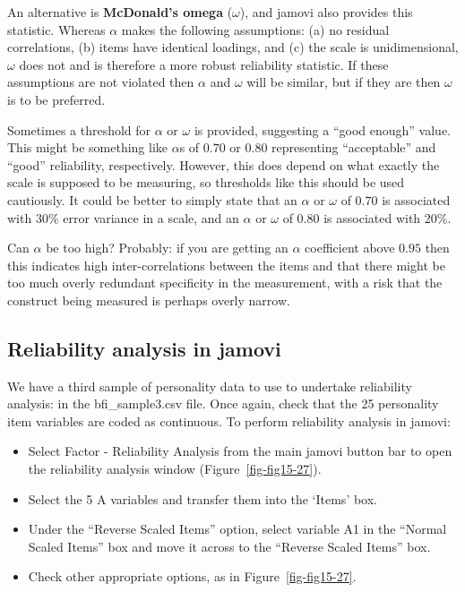 \documentclass[
  a4paper,
]{book}
\begin{document}
An alternative is \textbf{McDonald's omega} (\(\omega\)), and jamovi
also provides this statistic. Whereas \(\alpha\) makes the following
assumptions: (a) no residual correlations, (b) items have identical
loadings, and (c) the scale is unidimensional, \(\omega\) does not and
is therefore a more robust reliability statistic. If these assumptions
are not violated then \(\alpha\) and \(\omega\) will be similar, but if
they are then \(\omega\) is to be preferred.

Sometimes a threshold for \(\alpha\) or \(\omega\) is provided,
suggesting a ``good enough'' value. This might be something like
\(\alpha\)s of \(0.70\) or \(0.80\) representing ``acceptable'' and
``good'' reliability, respectively. However, this does depend on what
exactly the scale is supposed to be measuring, so thresholds like this
should be used cautiously. It could be better to simply state that an
\(\alpha\) or \(\omega\) of \(0.70\) is associated with 30\% error
variance in a scale, and an \(\alpha\) or \(\omega\) of \(0.80\) is
associated with 20\%.

Can \(\alpha\) be too high? Probably: if you are getting an \(\alpha\)
coefficient above \(0.95\) then this indicates high inter-correlations
between the items and that there might be too much overly redundant
specificity in the measurement, with a risk that the construct being
measured is perhaps overly narrow.

\hypertarget{reliability-analysis-in-jamovi}{%
\subsection{Reliability analysis in
jamovi}\label{reliability-analysis-in-jamovi}}

We have a third sample of personality data to use to undertake
reliability analysis: in the bfi\_sample3.csv file. Once again, check
that the 25 personality item variables are coded as continuous. To
perform reliability analysis in jamovi:

\begin{itemize}
\item
  Select Factor - Reliability Analysis from the main jamovi button bar
  to open the reliability analysis window (Figure~\ref{fig-fig15-27}).
\item
  Select the 5 A variables and transfer them into the `Items' box.
\item
  Under the ``Reverse Scaled Items'' option, select variable A1 in the
  ``Normal Scaled Items'' box and move it across to the ``Reverse Scaled
  Items'' box.
\item
  Check other appropriate options, as in Figure~\ref{fig-fig15-27}.
\end{itemize}
\end{document}
